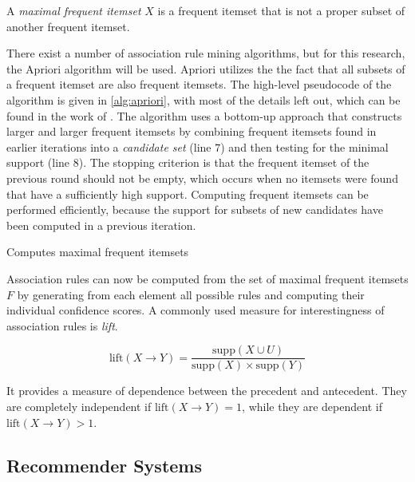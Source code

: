 \begin{definition}
	A \emph{maximal frequent itemset} $X$ is a frequent itemset that is not a proper subset of another frequent itemset.
\end{definition}

There exist a number of association rule mining algorithms, but for this research, the Apriori algorithm \citep{Agrawal1993} will be used.
Apriori utilizes the the fact that all subsets of a frequent itemset are also frequent itemsets.
The high-level pseudocode of the algorithm is given in \cref{alg:apriori}, with most of the details left out, which can be found in the work of \cite{Agrawal1993}.
The algorithm uses a bottom-up approach that constructs larger and larger frequent itemsets by combining frequent itemsets found in earlier iterations into a \emph{candidate set} (line $7$) and then testing for the minimal support (line $8$).
The stopping criterion is that the frequent itemset of the previous round should not be empty, which occurs when no itemsets were found that have a sufficiently high support.
Computing frequent itemsets can be performed efficiently, because the support for subsets of new candidates have been computed in a previous iteration.

\begin{algorithm}[htbp]
	\caption{Computes maximal frequent itemsets}
	\label{alg:apriori}
	
\end{algorithm}

Association rules can now be computed from the set of maximal frequent itemsets $F$ by generating from each element all possible rules and computing their individual confidence scores.
A commonly used measure for interestingness of association rules is \emph{lift}.

\begin{equation}
	\mathrm{lift}(X \rightarrow Y)=\frac{\mathrm{supp}(X \cup U)}{\mathrm{supp}(X) \times \mathrm{supp}(Y)}
\end{equation}

It provides a measure of dependence between the precedent and antecedent.
They are completely independent if $\mathrm{lift}(X \rightarrow Y)=1$, while they are dependent if $\mathrm{lift}(X \rightarrow Y)>1$.




\subsection{Recommender Systems}
\label{subsec:recommender_systems}

